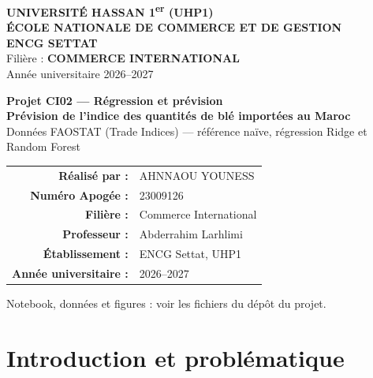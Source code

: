 \documentclass[11pt,a4paper]{article}
\begin{document}
\begin{titlepage}
\thispagestyle{empty}
\centering
\vspace*{0.4cm}
{\large\bfseries\color{vert} UNIVERSITÉ HASSAN 1\textsuperscript{er} (UHP1)}\\[0.25cm]
{\large\bfseries\color{vert} ÉCOLE NATIONALE DE COMMERCE ET DE GESTION}\\[0.15cm]
{\large\bfseries\color{vert} ENCG SETTAT}\\[0.5cm]
{\color{gris} Filière : \textbf{COMMERCE INTERNATIONAL}}\\[0.2cm]
{\color{gris} Année universitaire 2026--2027}

\vspace{2.2cm}
{\color{terre}\bfseries\large Projet CI02 --- Régression et prévision}\\[0.6cm]
{\Huge\bfseries\color{vert} Prévision de l'indice des quantités de blé importées au Maroc}\\[0.7cm]
{\large Données FAOSTAT (Trade Indices) --- référence naïve, régression Ridge et Random Forest}

\vspace{2.4cm}
\begin{tabular}{@{}r@{\hspace{0.8em}}l@{}}
\textbf{Réalisé par :} & AHNNAOU YOUNESS \\[0.2cm]
\textbf{Numéro Apogée :} & 23009126 \\[0.2cm]
\textbf{Filière :} & Commerce International \\[0.2cm]
\textbf{Professeur :} & Abderrahim Larhlimi \\[0.2cm]
\textbf{Établissement :} & ENCG Settat, UHP1 \\[0.2cm]
\textbf{Année universitaire :} & 2026--2027 \\
\end{tabular}

\vfill
{\small\color{gris} Notebook, données et figures : voir les fichiers du dépôt du projet.}
\vspace{0.3cm}
\end{titlepage}

\tableofcontents
\clearpage

\section{Introduction et problématique}
\end{document}
